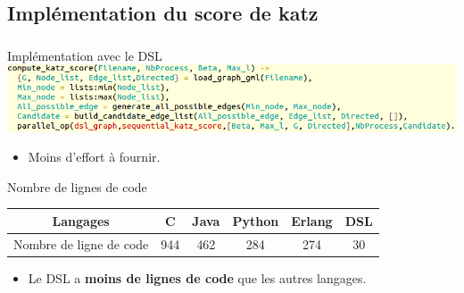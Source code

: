 \documentclass[10pt]{beamer}
\begin{document}
\subsection{Implémentation du score de katz}
\begin{frame}%
\frametitle{}
\begin{exampleblock}{Implémentation avec le DSL}
      \includegraphics[scale=0.405]{images/exempleDeCodeDSL.png}
\end{exampleblock}
\begin{itemize}
 \item Moins d'effort à fournir.
\end{itemize}

\begin{block}{Nombre de lignes de code}
 \begin{center}
\begin{table}[h]
 \begin{tabular}{|c|c|c|c|c|c|}
   \hline
   Langages		  &C	&Java	&Python	&Erlang	&DSL\\
    \hline
   Nombre de ligne de code&944	&462	&284	&274	&30 \\
    \hline
  \end{tabular}
 \end{table}
\end{center}
\end{block}
\begin{itemize}
 \item Le DSL a \textbf{moins de lignes de code} que les autres langages.
\end{itemize}
\end{frame}
\end{document}
